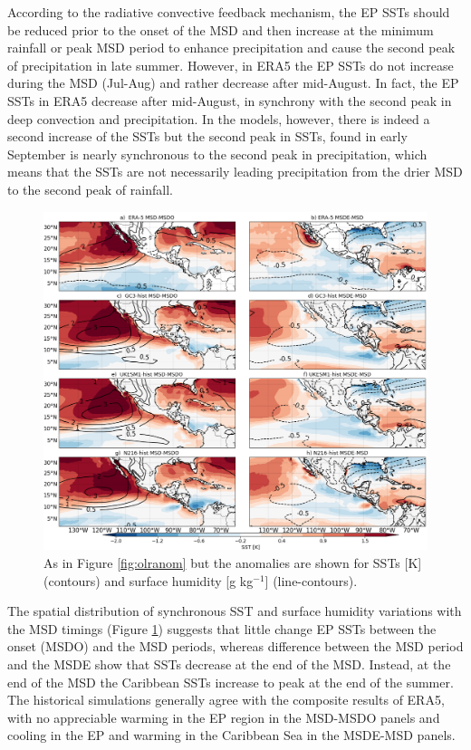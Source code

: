 According to the radiative convective feedback mechanism, the EP SSTs should be reduced prior to the onset of the MSD and then increase at the minimum rainfall or peak MSD period to enhance precipitation and cause the second peak of precipitation in late summer. However, in ERA5 the EP SSTs do not increase during the MSD (Jul-Aug) and rather decrease after mid-August. In fact, the EP SSTs in ERA5 decrease after mid-August, in synchrony with the second peak in deep convection and precipitation. 
 In the models, however, there is indeed a second increase of the SSTs but the second peak in SSTs, found in early September is nearly synchronous to the second peak in precipitation, which means that the SSTs are not necessarily leading precipitation from the drier MSD to the second peak of rainfall. 


\begin{figure}[t!]
\includegraphics[width=\linewidth]{figures/fig4_sstv_3.png}
\caption{As in Figure \ref{fig:olranom} but the anomalies are shown for SSTs [K] (contours) and surface humidity [g kg$^{-1}$] (line-contours).  }
\label{fig:msdsstanom}
\end{figure}




The spatial distribution of synchronous SST and surface humidity variations with the MSD timings  (Figure \ref{fig:msdsstanom}) suggests that little change EP SSTs between the onset (MSDO) and the  MSD periods, whereas difference between the MSD period and the MSDE show that SSTs decrease at the end of the MSD. 
Instead, at the end of the MSD the Caribbean SSTs increase to peak at the end of the summer.
The historical simulations generally agree with the composite results of ERA5, with no appreciable warming in the EP region in the MSD-MSDO panels and cooling in the EP and warming in the Caribbean Sea in the MSDE-MSD panels.


